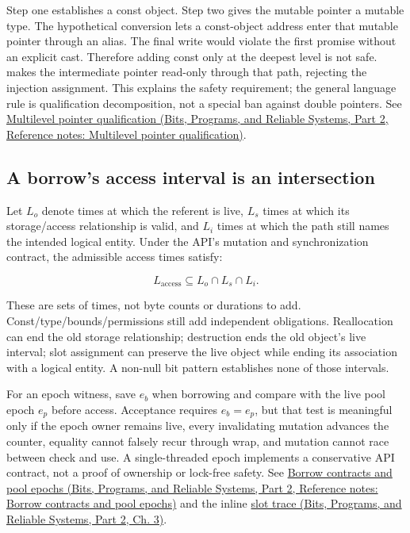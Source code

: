Step one establishes a const object. Step two gives the mutable pointer a mutable type. The hypothetical conversion lets a const-object address enter that mutable pointer through an alias. The final write would violate the first promise without an explicit cast. Therefore adding const only at the deepest level is not safe.  makes the intermediate pointer read-only through that path, rejecting the injection assignment. This explains the safety requirement; the general language rule is qualification decomposition, not a special ban against double pointers. See \href{../01-Bits-Programs-and-Reliable-Systems-P02/main.pdf\#nameddest=appendix-5e1a7561cd98}{Multilevel pointer qualification (Bits, Programs, and Reliable Systems, Part 2, Reference notes: Multilevel pointer qualification)}.

\subsection{A borrow's access interval is an intersection}\label{03-visual-computing-i-ch018-a-borrows-access-interval-is-an-intersection}

\hypertarget{03-visual-computing-i-ch018-a-borrows-access-interval-is-an-intersection}{}

Let \(L_o\) denote times at which the referent is live, \(L_s\) times at which its storage/access relationship is valid, and \(L_i\) times at which the path still names the intended logical entity. Under the API's mutation and synchronization contract, the admissible access times satisfy:

\[
L_{\mathrm{access}}\subseteq L_o\cap L_s\cap L_i.
\]

These are sets of times, not byte counts or durations to add. Const/type/bounds/permissions still add independent obligations. Reallocation can end the old storage relationship; destruction ends the old object's live interval; slot assignment can preserve the live object while ending its association with a logical entity. A non-null bit pattern establishes none of those intervals.

For an epoch witness, save \(e_b\) when borrowing and compare with the live pool epoch \(e_p\) before access. Acceptance requires \(e_b=e_p\), but that test is meaningful only if the epoch owner remains live, every invalidating mutation advances the counter, equality cannot falsely recur through wrap, and mutation cannot race between check and use. A single-threaded epoch implements a conservative API contract, not a proof of ownership or lock-free safety. See \href{../01-Bits-Programs-and-Reliable-Systems-P02/main.pdf\#nameddest=appendix-aa405b7c3903}{Borrow contracts and pool epochs (Bits, Programs, and Reliable Systems, Part 2, Reference notes: Borrow contracts and pool epochs)} and the inline \href{../01-Bits-Programs-and-Reliable-Systems-P02/main.pdf\#nameddest=01-foundations-i-ch003-when-a-valid-borrow-stops-naming-the-intended-thing}{slot trace (Bits, Programs, and Reliable Systems, Part 2, Ch. 3)}.

